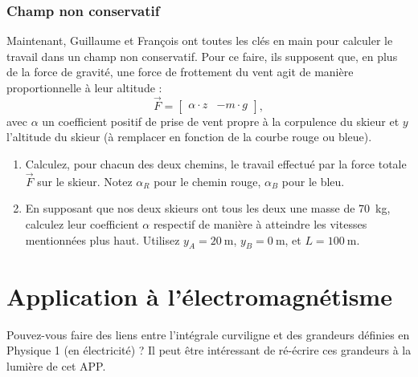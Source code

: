 \documentclass{cup-pan}
\begin{document}
\vspace{\baselineskip}


\subsubsection{Champ non conservatif}

Maintenant, Guillaume et François ont toutes les clés en main pour calculer le travail dans un champ non conservatif. Pour ce faire, ils supposent que, en plus de la force de gravité, une force de frottement du vent agit de manière proportionnelle à leur altitude :
\begin{equation}
     \vec{F} = \begin{bmatrix} \alpha \cdot z &-m\cdot g \end{bmatrix},
\end{equation}
avec $\alpha$ un coefficient positif de prise de vent propre à la corpulence du skieur et $y$ l'altitude du skieur (à remplacer en fonction de la courbe rouge ou bleue).


\vspace{\baselineskip}


\vspace{\baselineskip}
\questions
\begin{enumerate}
    \item Calculez, pour chacun des deux chemins, le travail effectué par la force totale $\vec{F}$ sur le skieur. Notez $\alpha_R$ pour le chemin rouge, $\alpha_B$ pour le bleu.
    \item En supposant que nos deux skieurs ont tous les deux une masse de \SI{70}{\kilo\gram}, calculez leur coefficient $\alpha$ respectif de manière à atteindre les vitesses mentionnées plus haut. Utilisez $y_A = \SI{20}{\meter}$, $y_B = \SI{0}{\meter}$, et $L = \SI{100}{\meter}$.
\end{enumerate}


\section*{Application à l'électromagnétisme}

Pouvez-vous faire des liens entre l'intégrale curviligne et des grandeurs définies en Physique 1 (en électricité) ? Il peut être intéressant de ré-écrire ces grandeurs à la lumière de cet APP. 
\end{document}
